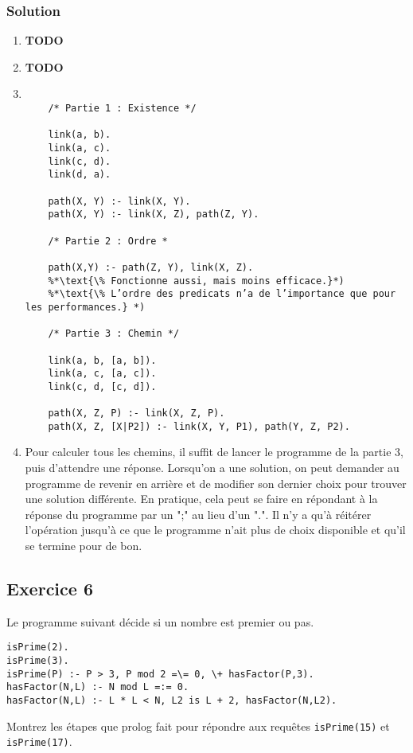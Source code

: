     \subsubsection*{Solution}
    \begin{enumerate}
    \item \textbf{TODO}
    \item \textbf{TODO}
    \item
    \begin{lstlisting}
    
    /* Partie 1 : Existence */
    
    link(a, b).
    link(a, c).
    link(c, d).
    link(d, a).
    
    path(X, Y) :- link(X, Y).
    path(X, Y) :- link(X, Z), path(Z, Y).
    
    /* Partie 2 : Ordre *
    
    path(X,Y) :- path(Z, Y), link(X, Z).
    %*\text{\% Fonctionne aussi, mais moins efficace.}*)
    %*\text{\% L’ordre des predicats n’a de l’importance que pour les performances.} *)
    
    /* Partie 3 : Chemin */
    
    link(a, b, [a, b]).
    link(a, c, [a, c]).
    link(c, d, [c, d]).
    
    path(X, Z, P) :- link(X, Z, P).
    path(X, Z, [X|P2]) :- link(X, Y, P1), path(Y, Z, P2).
    \end{lstlisting}
    
    \item Pour calculer tous les chemins, il suffit de lancer le programme de la partie 3, puis d'attendre une réponse.
    Lorsqu'on a une solution, on peut demander au programme de revenir en arrière et de modifier son dernier choix pour trouver une solution différente.
    En pratique, cela peut se faire en répondant à la réponse du programme par un ";" au lieu d'un ".".
    Il n'y a qu'à réitérer l'opération jusqu'à ce que le programme n'ait plus de choix disponible et qu'il se termine pour de bon.
    
   \end{enumerate}
\subsection*{Exercice 6}
Le programme suivant d\'{e}cide si un nombre est premier ou pas.

\begin{verbatim}
isPrime(2).
isPrime(3).
isPrime(P) :- P > 3, P mod 2 =\= 0, \+ hasFactor(P,3).  
hasFactor(N,L) :- N mod L =:= 0.
hasFactor(N,L) :- L * L < N, L2 is L + 2, hasFactor(N,L2). 
\end{verbatim}
Montrez les \'{e}tapes que prolog fait pour r\'{e}pondre aux requ\^{e}tes \texttt{isPrime(15)} et \texttt{isPrime(17)}.

